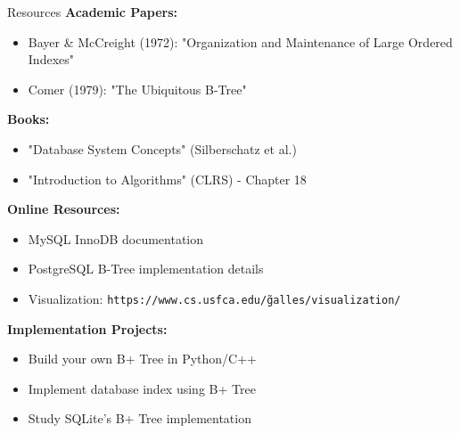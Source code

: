 \documentclass[aspectratio=169]{beamer}
\begin{document}
\begin{frame}{Resources}
  \textbf{Academic Papers:}
  \begin{itemize}
    \item Bayer \& McCreight (1972): "Organization and Maintenance of Large Ordered Indexes"
    \item Comer (1979): "The Ubiquitous B-Tree"
  \end{itemize}

  \vspace{0.3cm}
  \textbf{Books:}
  \begin{itemize}
    \item "Database System Concepts" (Silberschatz et al.)
    \item "Introduction to Algorithms" (CLRS) - Chapter 18
  \end{itemize}

  \vspace{0.3cm}
  \textbf{Online Resources:}
  \begin{itemize}
    \item MySQL InnoDB documentation
    \item PostgreSQL B-Tree implementation details
    \item Visualization: \texttt{https://www.cs.usfca.edu/\~galles/visualization/}
  \end{itemize}

  \vspace{0.3cm}
  \textbf{Implementation Projects:}
  \begin{itemize}
    \item Build your own B+ Tree in Python/C++
    \item Implement database index using B+ Tree
    \item Study SQLite's B+ Tree implementation
  \end{itemize}
\end{frame}
\end{document}
